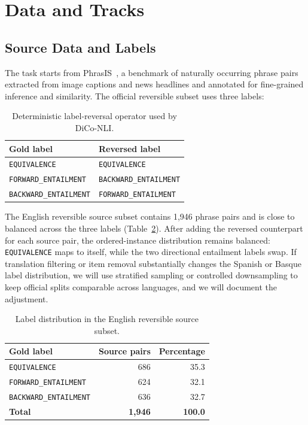 \documentclass[11pt]{article}
\begin{document}
\section{Data and Tracks}

\subsection{Source Data and Labels}

The task starts from PhrasIS~\cite{10.1093/jigpal/jzae037}, a benchmark of naturally occurring phrase pairs extracted from image captions and news headlines and annotated for fine-grained inference and similarity.
The official reversible subset uses three labels:

\begin{table}[h]
\centering
\small
\begin{tabular}{ll}
\toprule
Gold label & Reversed label \\
\midrule
\texttt{EQUIVALENCE} & \texttt{EQUIVALENCE} \\
\texttt{FORWARD\_ENTAILMENT} & \texttt{BACKWARD\_ENTAILMENT} \\
\texttt{BACKWARD\_ENTAILMENT} & \texttt{FORWARD\_ENTAILMENT} \\
\bottomrule
\end{tabular}
\caption{Deterministic label-reversal operator used by DiCo-NLI.}
\label{tab:rev}
\end{table}

The English reversible source subset contains 1,946 phrase pairs and is close to balanced across the three labels (Table~\ref{tab:label-balance}).
After adding the reversed counterpart for each source pair, the ordered-instance distribution remains balanced: \texttt{EQUIVALENCE} maps to itself, while the two directional entailment labels swap.
If translation filtering or item removal substantially changes the Spanish or Basque label distribution, we will use stratified sampling or controlled downsampling to keep official splits comparable across languages, and we will document the adjustment.

\begin{table}[h]
\centering
\small
\begin{tabular}{lrr}
\toprule
Gold label & Source pairs & Percentage \\
\midrule
\texttt{EQUIVALENCE} & 686 & 35.3 \\
\texttt{FORWARD\_ENTAILMENT} & 624 & 32.1 \\
\texttt{BACKWARD\_ENTAILMENT} & 636 & 32.7 \\
\midrule
\textbf{Total} & \textbf{1,946} & \textbf{100.0} \\
\bottomrule
\end{tabular}
\caption{Label distribution in the English reversible source subset.}
\label{tab:label-balance}
\end{table}
\end{document}
